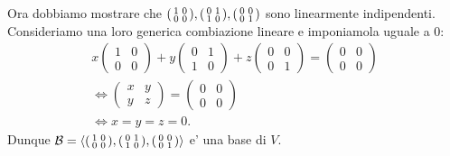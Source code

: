 \begin{solution}
    Ora dobbiamo mostrare che $\begin{psmallmatrix} 1&0\\0&0 \end{psmallmatrix}, \begin{psmallmatrix} 0&1\\1&0 \end{psmallmatrix}, \begin{psmallmatrix} 0&0\\0&1 \end{psmallmatrix}$ sono linearmente indipendenti. Consideriamo una loro generica combiazione lineare e imponiamola uguale a $0$:
    \begin{gather*}
        x\begin{pmatrix} 1&0\\0&0 \end{pmatrix} + y\begin{pmatrix} 0&1\\1&0 \end{pmatrix} + z\begin{pmatrix} 0&0\\0&1 \end{pmatrix} = \begin{pmatrix} 0&0\\0&0 \end{pmatrix} \\
        \iff \begin{pmatrix} x&y\\y&z \end{pmatrix} = \begin{pmatrix} 0&0\\0&0 \end{pmatrix} \\
        \iff x = y = z = 0.
    \end{gather*}
    Dunque $\mathcal{B} = \left\langle \begin{psmallmatrix} 1&0\\0&0 \end{psmallmatrix}, \begin{psmallmatrix} 0&1\\1&0 \end{psmallmatrix}, \begin{psmallmatrix} 0&0\\0&1 \end{psmallmatrix} \right\rangle$ e' una base di $V$.


\end{solution}
